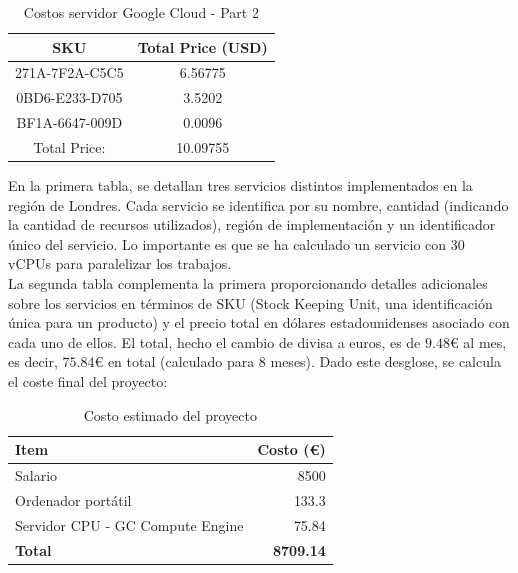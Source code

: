 \begin{table}[htp]
      \centering
      \begin{tabular}{|c|c|}
            \hline
            \textbf{SKU}   & \textbf{Total Price (USD)} \\
            \hline
            271A-7F2A-C5C5 & 6.56775                    \\
            0BD6-E233-D705 & 3.5202                     \\
            BF1A-6647-009D & 0.0096                     \\
            \hline
            Total Price:   & 10.09755                   \\
            \hline
      \end{tabular}
      \caption{Costos servidor Google Cloud - Part 2}
      \label{tab:server_costs_part2}
\end{table}
En la primera tabla, se detallan tres servicios distintos implementados en la región de Londres. Cada servicio se identifica por su nombre, cantidad (indicando la cantidad de recursos utilizados), región de implementación y un identificador único del servicio. Lo importante es que se ha calculado un servicio con $30$ vCPUs para paralelizar los trabajos.\\[6pt]

La segunda tabla complementa la primera proporcionando detalles adicionales sobre los servicios en términos de SKU (Stock Keeping Unit, una identificación única para un producto) y el precio total en dólares estadounidenses asociado con cada uno de ellos. El total, hecho el cambio de divisa a euros, es de $9.48$€ al mes, es decir, $75.84$€ en total (calculado para 8 meses).
Dado este desglose, se calcula el coste final del proyecto:
\begin{table}[htp]
      \centering
      \begin{tabular}{|l|r|}
            \hline
            \textbf{Item}                    & \textbf{Costo (€)} \\ \hline
            Salario                          & 8500               \\
            Ordenador portátil               & 133.3              \\
            Servidor CPU - GC Compute Engine & 75.84              \\
            \textbf{Total}                   & \textbf{8709.14}   \\ \hline
      \end{tabular}
      \caption{Costo estimado del proyecto}
      \label{tab:proyect_budget}
\end{table}